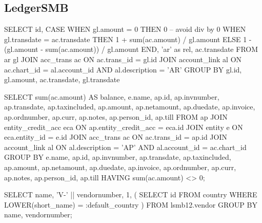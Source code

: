 \documentclass[11pt,a4paper]{globis-book}
\begin{document}
\subsection*{LedgerSMB}
\begin{setq}
SELECT
  id,
  CASE
    WHEN gl.amount = 0
      THEN 0 -- avoid div by 0
    WHEN gl.transdate = ac.transdate
      THEN 1 + sum(ac.amount) / gl.amount
    ELSE 
      1 - (gl.amount - sum(ac.amount)) / gl.amount
  END,
  'ar' as rel,
  ac.transdate
FROM ar gl
JOIN acc_trans ac ON ac.trans_id = gl.id
JOIN account_link al
  ON ac.chart_id = al.account_id
    AND al.description = 'AR'
GROUP BY
  gl.id,
  gl.amount,
  ac.transdate,
  gl.transdate
\end{setq}
\begin{setq}
SELECT
  sum(ac.amount) AS balance,
  e.name, ap.id,
  ap.invnumber,
  ap.transdate,
  ap.taxincluded,
  ap.amount,
  ap.netamount,
  ap.duedate,
  ap.invoice,
  ap.ordnumber,
  ap.curr,
  ap.notes,
  ap.person_id,
  ap.till
FROM ap
 JOIN entity_credit_acc eca ON ap.entity_credit_acc = eca.id
 JOIN entity e ON eca.entity_id = e.id
 JOIN acc_trans ac ON ac.trans_id = ap.id
 JOIN account_link al
   ON al.description = 'AP'
     AND al.account_id = ac.chart_id
GROUP BY
  e.name,
  ap.id,
  ap.invnumber,
  ap.transdate,
  ap.taxincluded,
  ap.amount,
  ap.netamount,
  ap.duedate,
  ap.invoice,
  ap.ordnumber,
  ap.curr,
  ap.notes,
  ap.person_id,
  ap.till
HAVING sum(ac.amount) <> 0;
\end{setq}
\begin{setq}
SELECT
  name,
  'V-' || vendornumber,
  1,
  (
    SELECT
      id
    FROM
      country 
    WHERE
     LOWER(short_name)  = :default_country
  )
FROM
  lsmb12.vendor
GROUP BY
  name,
  vendornumber;
\end{setq}
\end{document}
